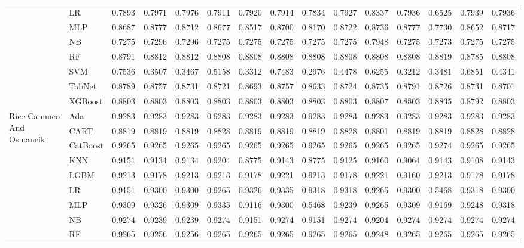 \begin{table*}[ht]
{\begin{tabular}{llrrrrrrrrrrrrr}
 & LR & 0.7893 & 0.7971 & 0.7976 & 0.7911 & 0.7920 & 0.7914 & 0.7834 & 0.7927 & 0.8337 & 0.7936 & 0.6525 & 0.7939 & 0.7936 \\
 & MLP & 0.8687 & 0.8777 & 0.8712 & 0.8677 & 0.8517 & 0.8700 & 0.8170 & 0.8722 & 0.8736 & 0.8777 & 0.7730 & 0.8652 & 0.8717 \\
 & NB & 0.7275 & 0.7296 & 0.7296 & 0.7275 & 0.7275 & 0.7275 & 0.7275 & 0.7275 & 0.7948 & 0.7275 & 0.7273 & 0.7275 & 0.7275 \\
 & RF & 0.8791 & 0.8812 & 0.8812 & 0.8808 & 0.8808 & 0.8808 & 0.8808 & 0.8808 & 0.8808 & 0.8808 & 0.8819 & 0.8785 & 0.8808 \\
 & SVM & 0.7536 & 0.3507 & 0.3467 & 0.5158 & 0.3312 & 0.7483 & 0.2976 & 0.4478 & 0.6255 & 0.3212 & 0.3481 & 0.6851 & 0.4341 \\
 & TabNet & 0.8789 & 0.8757 & 0.8731 & 0.8721 & 0.8693 & 0.8757 & 0.8633 & 0.8724 & 0.8735 & 0.8791 & 0.8726 & 0.8731 & 0.8701 \\
 & XGBoost & 0.8803 & 0.8803 & 0.8803 & 0.8803 & 0.8803 & 0.8803 & 0.8803 & 0.8803 & 0.8807 & 0.8803 & 0.8835 & 0.8792 & 0.8803 \\
\cline{1-15}
\multirow[t]{12}{*}{Rice Cammeo And Osmancik} & Ada & 0.9283 & 0.9283 & 0.9283 & 0.9283 & 0.9283 & 0.9283 & 0.9283 & 0.9283 & 0.9283 & 0.9283 & 0.9283 & 0.9283 & 0.9283 \\
 & CART & 0.8819 & 0.8819 & 0.8819 & 0.8828 & 0.8819 & 0.8819 & 0.8819 & 0.8828 & 0.8801 & 0.8819 & 0.8819 & 0.8828 & 0.8828 \\
 & CatBoost & 0.9265 & 0.9265 & 0.9265 & 0.9265 & 0.9265 & 0.9265 & 0.9265 & 0.9265 & 0.9265 & 0.9265 & 0.9274 & 0.9265 & 0.9265 \\
 & KNN & 0.9151 & 0.9134 & 0.9134 & 0.9204 & 0.8775 & 0.9143 & 0.8775 & 0.9125 & 0.9160 & 0.9064 & 0.9143 & 0.9108 & 0.9143 \\
 & LGBM & 0.9213 & 0.9178 & 0.9213 & 0.9213 & 0.9178 & 0.9221 & 0.9213 & 0.9178 & 0.9221 & 0.9160 & 0.9213 & 0.9178 & 0.9178 \\
 & LR & 0.9151 & 0.9300 & 0.9300 & 0.9265 & 0.9326 & 0.9335 & 0.9318 & 0.9318 & 0.9265 & 0.9300 & 0.5468 & 0.9318 & 0.9300 \\
 & MLP & 0.9309 & 0.9326 & 0.9309 & 0.9335 & 0.9116 & 0.9300 & 0.5468 & 0.9239 & 0.9265 & 0.9309 & 0.9169 & 0.9248 & 0.9318 \\
 & NB & 0.9274 & 0.9239 & 0.9239 & 0.9274 & 0.9151 & 0.9274 & 0.9151 & 0.9274 & 0.9204 & 0.9274 & 0.9274 & 0.9274 & 0.9274 \\
 & RF & 0.9265 & 0.9256 & 0.9256 & 0.9265 & 0.9265 & 0.9265 & 0.9265 & 0.9265 & 0.9248 & 0.9265 & 0.9265 & 0.9265 & 0.9265 \\

\end{tabular}}
\end{table*}
